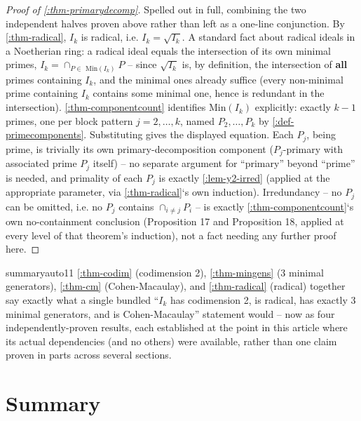 \documentclass[a4paper,11pt]{scrartcl}
\begin{document}
\begin{proof}[Proof of \cref{:thm-primarydecomp}] Spelled out in full, combining the two independent halves proven above rather than left as a one-line conjunction. By \cref{:thm-radical}, \(I_{k}\) is radical, i.e. \(I_{k} = \sqrt{I_{k}}\). A standard fact about radical ideals in a Noetherian ring: a radical ideal equals the intersection of its own minimal primes, \(I_{k} = \cap_{P \in \text{ Min}\left( I_{k} \right)}P\) -- since \(\sqrt{I_{k}}\) is, by definition, the intersection of \textbf{all} primes containing \(I_{k}\), and the minimal ones already suffice (every non-minimal prime containing \(I_{k}\) contains some minimal one, hence is redundant in the intersection). \cref{:thm-componentcount} identifies \(\text{Min}\left( I_{k} \right)\) explicitly: exactly \(k - 1\) primes, one per block pattern \(j = 2,\ldots,k\), named \(P_{2},\ldots,P_{k}\) by \cref{:def-primecomponents}. Substituting gives the displayed equation. Each \(P_{j}\), being prime, is trivially its own primary-decomposition component (\(P_{j}\)-primary with associated prime \(P_{j}\) itself) -- no separate argument for ``primary'' beyond ``prime'' is needed, and primality of each \(P_{j}\) is exactly \cref{:lem-y2-irred} (applied at the appropriate parameter, via \cref{:thm-radical}`s own induction). Irredundancy -- no \(P_{j}\) can be omitted, i.e. no \(P_{j}\) contains \(\cap_{i \neq j}P_{i}\) -- is exactly \cref{:thm-componentcount}`s own no-containment conclusion (Proposition 17 and Proposition 18, applied at every level of that theorem's induction), not a fact needing any further proof here.

\end{proof}

\begin{remark}{summary}{auto11} \cref{:thm-codim} (codimension 2), \cref{:thm-mingens} (3 minimal generators), \cref{:thm-cm} (Cohen-Macaulay), and \cref{:thm-radical} (radical) together say exactly what a single bundled ``\(I_{k}\) has codimension 2, is radical, has exactly 3 minimal generators, and is Cohen-Macaulay'' statement would -- now as four independently-proven results, each established at the point in this article where its actual dependencies (and no others) were available, rather than one claim proven in parts across several sections.

\end{remark}

\section{Summary}
\end{document}

